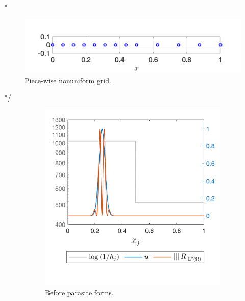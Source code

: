 \documentclass[final]{amsart}
\numberwithin{equation}{section}
\begin{document}
\/*
\begin{figure}[H]
	\centering
	\centering
	\includegraphics[scale=.5]{../figures/fig_grid_piecewise_nonu_2}	
	\caption{Piece-wise nonuniform grid.}
	\label{fig_grid_piecewise_nonu}
\end{figure}
*/

\begin{figure}[H]
	\centering
	\begin{subfigure}[b]{.3\textwidth}
		\includegraphics[width=\textwidth]{../figures/fig_CNCS_parasite_rep_20_zoom_off}	
		\caption{
			\label{fig:CNCS_parasite_1D_1}
			Before parasite forms.
		}
	\end{subfigure}
	\begin{subfigure}[b]{.3\textwidth}

\end{subfigure}
\end{figure}
\end{document}
